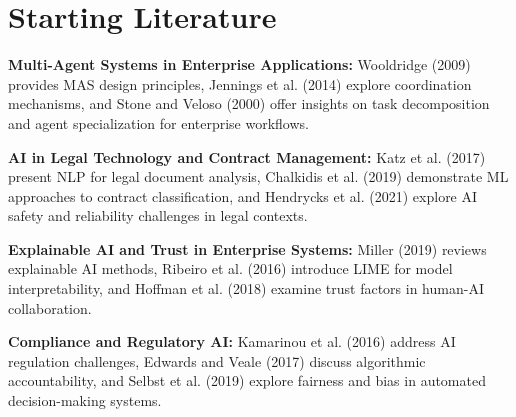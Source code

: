
\section{Starting Literature}\label{section:starting_literature}

\textbf{Multi-Agent Systems in Enterprise Applications:} Wooldridge (2009) provides MAS design principles, Jennings et al. (2014) explore coordination mechanisms, and Stone and Veloso (2000) offer insights on task decomposition and agent specialization for enterprise workflows.

\textbf{AI in Legal Technology and Contract Management:} Katz et al. (2017) present NLP for legal document analysis, Chalkidis et al. (2019) demonstrate ML approaches to contract classification, and Hendrycks et al. (2021) explore AI safety and reliability challenges in legal contexts.

\textbf{Explainable AI and Trust in Enterprise Systems:} Miller (2019) reviews explainable AI methods, Ribeiro et al. (2016) introduce LIME for model interpretability, and Hoffman et al. (2018) examine trust factors in human-AI collaboration.

\textbf{Compliance and Regulatory AI:} Kamarinou et al. (2016) address AI regulation challenges, Edwards and Veale (2017) discuss algorithmic accountability, and Selbst et al. (2019) explore fairness and bias in automated decision-making systems.
